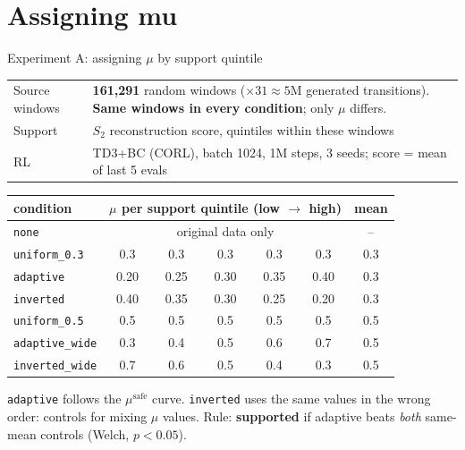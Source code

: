 \documentclass[aspectratio=169,11pt]{beamer}
\newcommand{\yes}{\textcolor{ok}{\textbf{supported}}}
\newcommand{\cond}[1]{\texttt{#1}}
\begin{document}
\section{Assigning mu}
\begin{frame}[shrink=3]{Experiment A: assigning $\mu$ by support quintile}
\small
\begin{tabularx}{\linewidth}{lY}
\toprule
Source windows & \textbf{161{,}291} random windows ($\times31\approx5$M generated transitions). \textbf{Same windows in every condition}; only $\mu$ differs.\\
Support & $S_2$ reconstruction score, quintiles within these windows\\
RL & TD3+BC (CORL), batch 1024, 1M steps, 3 seeds; score = mean of last 5 evals\\
\bottomrule
\end{tabularx}
\vspace{0.4em}

\centering
\begin{tabular}{lcccccc}
\toprule
condition & \multicolumn{5}{c}{$\mu$ per support quintile (low $\to$ high)} & mean\\
\midrule
\cond{none} & \multicolumn{5}{c}{original data only} & --\\
\cond{uniform\_0.3} & 0.3 & 0.3 & 0.3 & 0.3 & 0.3 & 0.3\\
\cond{adaptive} & 0.20 & 0.25 & 0.30 & 0.35 & 0.40 & 0.3\\
\cond{inverted} & 0.40 & 0.35 & 0.30 & 0.25 & 0.20 & 0.3\\
\midrule
\cond{uniform\_0.5} & 0.5 & 0.5 & 0.5 & 0.5 & 0.5 & 0.5\\
\cond{adaptive\_wide} & 0.3 & 0.4 & 0.5 & 0.6 & 0.7 & 0.5\\
\cond{inverted\_wide} & 0.7 & 0.6 & 0.5 & 0.4 & 0.3 & 0.5\\
\bottomrule
\end{tabular}

\raggedright\scriptsize \cond{adaptive} follows the $\mu^{\text{safe}}$ curve. \cond{inverted} uses the same values in the wrong order: controls for mixing $\mu$ values. Rule: \yes{} if adaptive beats \emph{both} same-mean controls (Welch, $p<0.05$).
\end{frame}
\end{document}
